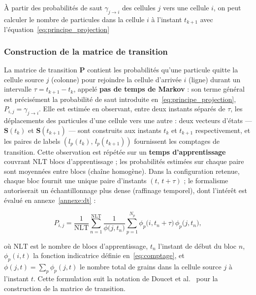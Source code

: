 \documentclass[french]{MemoireMaster}
\begin{document}
À partir des probabilités de saut $\gamma_{j \to i}$ des cellules $j$ vers une cellule $i$, on peut calculer le nombre de particules dans la cellule $i$ à l'instant $t_{k+1}$ avec l'équation~\ref{eq:principe_projection}

\subsubsection{Construction de la matrice de transition}
\label{subsubsec:matrice}

La matrice de transition $\mathbf{P}$ contient les probabilités qu'une particule quitte la cellule source $j$ (colonne) pour rejoindre la cellule d'arrivée $i$ (ligne) durant un intervalle $\tau=t_{k+1}-t_k$, appelé \textbf{pas de temps de Markov} : son terme général est précisément la probabilité de saut introduite en~\eqref{eq:principe_projection}, $P_{i,j} = \gamma_{j \to i}$. Elle est estimée en observant, entre deux instants séparés de $\tau$, les déplacements des particules d'une cellule vers une autre : deux vecteurs d'états --- $\mathbf{S}(t_k)$ et $\mathbf{S}(t_{k+1})$ --- sont construits aux instants $t_k$ et $t_{k+1}$ respectivement, et les paires de labels $(l_p(t_k),\, l_p(t_{k+1}))$ fournissent les comptages de transition. Cette observation est répétée sur un \textbf{temps d'apprentissage} couvrant $\mathrm{NLT}$ blocs d'apprentissage ; les probabilités estimées sur chaque paire sont moyennées entre blocs (chaîne homogène). Dans la configuration retenue, chaque bloc fournit une unique paire d'instants $(t,\, t+\tau)$ ; le formalisme autoriserait un échantillonnage plus dense (raffinage temporel), dont l'intérêt est évalué en annexe~\ref{annexe:dt} :

\begin{equation}
  P_{i,j}
  =
  \frac{1}{\mathrm{NLT}}
  \sum_{n=1}^{\mathrm{NLT}}
  \frac{1}{\phi\big(j,t_{n}\big)}
  \sum_{p=1}^{N_p}
  \phi_p\big(i,t_{n}+\tau\big)\,
  \phi_p\big(j,t_{n}\big),
  \label{eq:matrice_transition}
\end{equation}

où $\mathrm{NLT}$ est le nombre de blocs d'apprentissage, $t_n$ l'instant de début du bloc $n$, $\phi_p(i,t)$ la fonction indicatrice définie en~\eqref{eq:comptage}, et $\phi(j,t)=\sum_p \phi_p(j,t)$ le nombre total de grains dans la cellule source $j$ à l'instant $t$. Cette formulation suit la notation de Doucet et al.~\cite{doucet2008} pour la construction de la matrice de transition.
\end{document}
